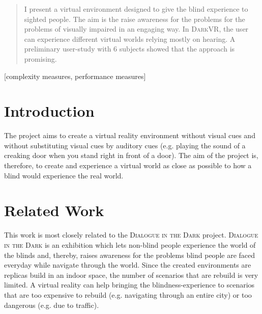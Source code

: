 \documentclass{sig-alternate}
\newcommand{\darkvr}{\textsc{DarkVR}\xspace}
\begin{document}
\maketitle
\begin{abstract}
I present a virtual environment designed to give the blind experience to sighted
people. The aim is the raise awareness for the problems for the problems of
visually impaired in an engaging way. In \darkvr, the user can experience
different virtual worlds relying mostly on hearing. A preliminary user-study
with 6 subjects showed that the approach is promising. 
\end{abstract}

[complexity measures, performance measures]



\section{Introduction}

The project aims to create a virtual reality environment without visual cues and
without substituting visual cues by auditory cues (e.g. playing the sound of a
creaking door when you stand right in front of a door). The aim of the project
is, therefore, to create and experience a virtual world as close as possible to
how a blind would experience the real world.


\section{Related Work}
This work is most closely related to the \textsc{Dialogue in the Dark}
project\cite{dialog}. \textsc{Dialogue in the Dark} is an exhibition which lets
non-blind people experience the world of the blinds and, thereby, raises
awareness for the problems blind people are faced everyday while navigate
through the world. Since the created environments are replicas build in an
indoor space, the number of scenarios that are rebuild is very limited. A
virtual reality can help bringing the blindness-experience to scenarios that are
too expensive to rebuild (e.g. navigating through an entire city) or too
dangerous (e.g. due to traffic).
\end{document}
